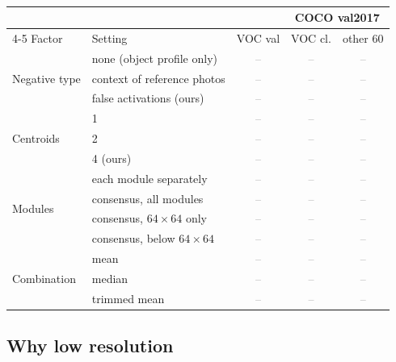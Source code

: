 \documentclass[runningheads]{llncs}
\newcommand{\x}{\textcolor{gray}{--}}          %
\begin{document}
\begin{table}[t]
\centering
\caption{}
\label{tab:gate}
\footnotesize\setlength{\tabcolsep}{4pt}
\begin{tabular}{@{}llccc@{}}
\toprule
 & & & \multicolumn{2}{c}{COCO val2017} \\
\cmidrule(lr){4-5}
Factor & Setting & VOC val & VOC cl. & other 60 \\
\midrule
\multirow{3}{*}{Negative type}
 & none (object profile only) & \x & \x & \x \\
 & context of reference photos & \x & \x & \x \\
 & false activations (ours)   & \x & \x & \x \\
\midrule
\multirow{3}{*}{Centroids}
 & 1                          & \x & \x & \x \\
 & 2                          & \x & \x & \x \\
 & 4 (ours)                   & \x & \x & \x \\
\midrule
\multirow{4}{*}{Modules}
 & each module separately     & \x & \x & \x \\
 & consensus, all modules     & \x & \x & \x \\
 & consensus, $64{\times}64$ only & \x & \x & \x \\
 & consensus, below $64{\times}64$ & \x & \x & \x \\
\midrule
\multirow{3}{*}{Combination}
 & mean                       & \x & \x & \x \\
 & median                     & \x & \x & \x \\
 & trimmed mean               & \x & \x & \x \\
\bottomrule
\end{tabular}
\end{table}

\subsection{Why low resolution}
\label{sec:why-lowres}
\end{document}
